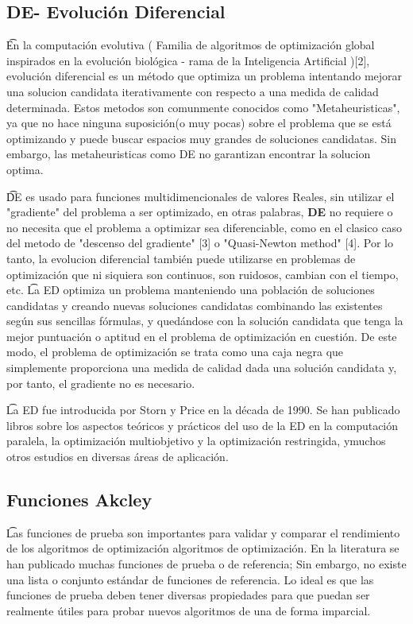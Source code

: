 \documentclass[10pt]{article}
\begin{document}
\subsection{\textbf{DE}- Evolución Diferencial }
\t En la computación evolutiva (  Familia de algoritmos de optimización global inspirados en la evolución biológica - rama de la Inteligencia Artificial )[2], evolución diferencial es un método que optimiza un problema intentando mejorar una solucion candidata iterativamente con respecto a una medida de calidad determinada. Estos metodos son comunmente conocidos como "Metaheuristicas", ya que no hace ninguna suposición(o muy pocas)  sobre el problema que se está optimizando y puede buscar espacios muy grandes de soluciones candidatas. Sin embargo, las metaheuristicas como DE no garantizan encontrar la solucion optima.

\t  DE es usado para funciones multidimencionales de valores Reales, sin utilizar el "gradiente" del problema a ser optimizado, en otras palabras, \textbf{DE} no requiere o no necesita que el problema a optimizar sea diferenciable, como en el clasico caso del metodo de "descenso del gradiente" [3] o "Quasi-Newton method" [4]. Por lo tanto, la evolucion diferencial también puede utilizarse en problemas de optimización que ni siquiera son continuos, son ruidosos, cambian con el tiempo, etc.
\t La ED optimiza un problema manteniendo una población de soluciones candidatas y creando nuevas soluciones candidatas combinando las existentes según sus sencillas fórmulas, y quedándose con la solución candidata que tenga la mejor puntuación o aptitud en el problema de optimización en cuestión. De este modo, el problema de optimización se trata como una caja negra que simplemente proporciona una medida de calidad dada una solución candidata y, por tanto, el gradiente no es necesario.

\t La ED fue introducida por Storn y Price en la década de 1990. Se han publicado libros sobre los aspectos teóricos y prácticos del uso de la ED en la computación paralela, la optimización multiobjetivo y la optimización restringida, ymuchos otros estudios en diversas áreas de aplicación. 

\subsection{Funciones Akcley}

\t Las funciones de prueba son importantes para validar y comparar el rendimiento de los algoritmos de optimización algoritmos de optimización. En la literatura se han publicado muchas funciones de prueba o de referencia; Sin embargo, no existe una lista o conjunto estándar de funciones de referencia. Lo ideal es que las funciones de prueba deben tener diversas propiedades para que puedan ser realmente útiles para probar nuevos algoritmos de una de forma imparcial.
\end{document}
